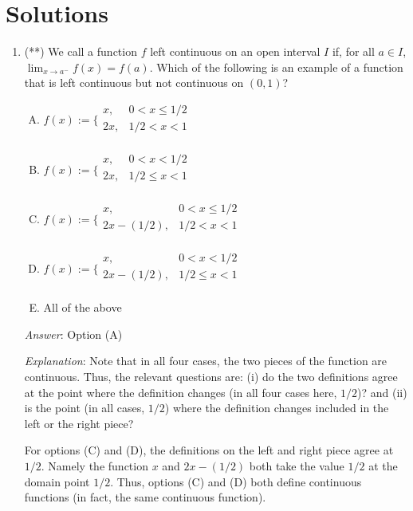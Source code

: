 \documentclass[10pt]{amsart}
\begin{document}
\section{Solutions}
\begin{enumerate}

\item (**) We call a function $f$ left continuous on an open interval $I$
  if, for all $a \in I$, $\lim_{x \to a^-} f(x) = f(a)$. Which of the
  following is an example of a function that is left continuous but
  not continuous on $(0,1)$?

  \begin{enumerate}[(A)]
  \item $f(x) := \lbrace\begin{array}{rl}x, & 0 < x \le 1/2 \\ 2x, & 1/2 < x < 1 \\\end{array}$
  \item $f(x) := \lbrace\begin{array}{rl}x, & 0 < x < 1/2 \\ 2x, & 1/2 \le x < 1 \\\end{array}$
  \item $f(x) := \lbrace\begin{array}{rl}x, & 0 < x \le 1/2 \\ 2x - (1/2), & 1/2 < x < 1 \\\end{array}$
  \item $f(x) := \lbrace\begin{array}{rl}x, & 0 < x < 1/2 \\ 2x - (1/2), & 1/2 \le x < 1 \\\end{array}$
  \item All of the above
  \end{enumerate}

  {\em Answer}: Option (A)

  {\em Explanation}: Note that in all four cases, the two pieces of
  the function are continuous. Thus, the relevant questions are: (i) do
  the two definitions agree at the point where the definition changes
  (in all four cases here, $1/2$)? and (ii) is the point (in all cases,
  $1/2$) where the definition changes included in the left or the
  right piece?

  For options (C) and (D), the definitions on the left and right piece
  agree at $1/2$. Namely the function $x$ and $2x - (1/2)$ both take the
  value $1/2$ at the domain point $1/2$. Thus, options (C) and (D)
  both define continuous functions (in fact, the same continuous
  function).


\end{enumerate}
\end{document}
